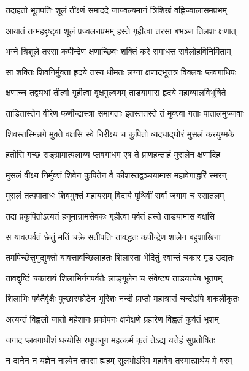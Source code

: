 \twolineshloka
{तदाहतो भूतपतिः शूलं तीक्ष्णं समाददे}
{जाज्वल्यमानं त्रिशिखं वह्निज्वालासमप्रभम्}%

\twolineshloka
{आयातं तन्महद्दृष्ट्वा शूलं प्रज्वलनप्रभम्}
{हस्ते गृहीत्वा तरसा बभञ्ज तिलशः क्षणात्}%

\twolineshloka
{भग्ने त्रिशूले तरसा कपीन्द्रेण क्षणाच्छिवः}
{शक्तिं करे समाधत्त सर्वलोहविनिर्मिताम्}%

\twolineshloka
{सा शक्तिः शिवनिर्मुक्ता हृदये तस्य धीमतः}
{लग्ना क्षणादभूत्तत्र विक्लवः प्लवगाधिपः}%

\twolineshloka
{क्षणाच्च तद्व्यथां तीर्त्वा गृहीत्वा वृक्षमुल्बणम्}
{ताडयामास हृदये महाव्यालविभूषिते}%

\twolineshloka
{ताडितास्तेन वीरेण फणीन्द्रास्त्रा समागताः}
{इतस्ततस्ते तं मुक्त्वा गताः पातालमुज्जवाः}%

\twolineshloka
{शिवस्तस्मिन्नगे मुक्ते वक्षसि स्वे निरीक्ष्य च}
{कुपितो व्यदधाद्घोरं मुसलं करयुग्मके}%

\twolineshloka
{हतोसि गच्छ सङ्ग्रामात्पलाय्य प्लवगाधम}
{एष ते प्राणहन्ताहं मुसलेन क्षणादिह}%

\twolineshloka
{मुसलं वीक्ष्य निर्मुक्तं शिवेन कुपितेन वै}
{कीशस्तद्वञ्चयामास महावेगाद्धरिं स्मरन्}%

\twolineshloka
{मुसलं तत्पपाताधः शिवमुक्तं महायसम्}
{विदार्य पृथिवीं सर्वां जगाम च रसातलम्}%

\twolineshloka
{तदा प्रकुपितोऽत्यतं हनूमान्रामसेवकः}
{गृहीत्वा पर्वतं हस्ते ताडयामास वक्षसि}%

\twolineshloka
{स यावत्पर्वतं छेत्तुं मतिं चक्रे सतीपतिः}
{तावद्धतः कपीन्द्रेण शालेन बहुशाखिना}%

\twolineshloka
{तमपिच्छेत्तुमुद्युक्तो यावत्तावच्छिलाहतः}
{शिलास्ता भेदितुं स्वान्तं चकार मृड उद्यतः}%

\twolineshloka
{तावद्वृष्टिं चकारायं शिलाभिर्नगपर्वतैः}
{लाङ्गूलेन च संवेष्ट्य ताडयत्येष भूतपम्}%

\twolineshloka
{शिलाभिः पर्वतैर्वृक्षैः पुच्छास्फोटेन भूरिशः}
{नन्दी प्राप्तो महात्रासं चन्द्रोऽपि शकलीकृतः}%

\twolineshloka
{अत्यन्तं विह्वलो जातो महेशानः प्रकोपनः}
{क्षणेक्षणे प्रहारेण विह्वलं कुर्वतं भृशम्}%

\twolineshloka
{जगाद प्लवगाधीशं धन्योसि रघुपानुग}
{महत्कर्म कृतं तेऽद्य यत्तेहं सुप्रतोषितः}%

\twolineshloka
{न दानेन न यज्ञेन नाल्पेन तपसा ह्यहम्}
{सुलभोऽस्मि महावेग तस्मात्प्रार्थय मे वरम्}%


